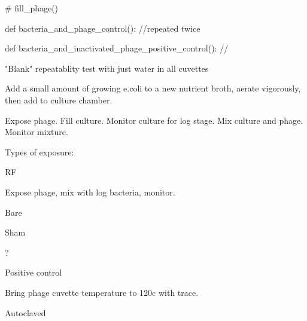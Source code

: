 \documentclass[paper.tex]{subfiles}%
\begin{document}
    # fill_phage()


def bacteria_and_phage_control():
    //repeated twice


def bacteria_and_inactivated_phage_positive_control():
    //

"Blank" repeatablity test with just water in all cuvettes


Add a small amount of growing e.coli to a new nutrient broth,
aerate vigorously, then add to culture chamber.

Expose phage.
Fill culture.
Monitor culture for log stage.
Mix culture and phage.
Monitor mixture.

Types of exposure:

RF

Expose phage, mix with log bacteria, monitor.

Bare

Sham

?

Positive control

Bring phage cuvette temperature to 120c with trace.



Autoclaved
\end{document}
